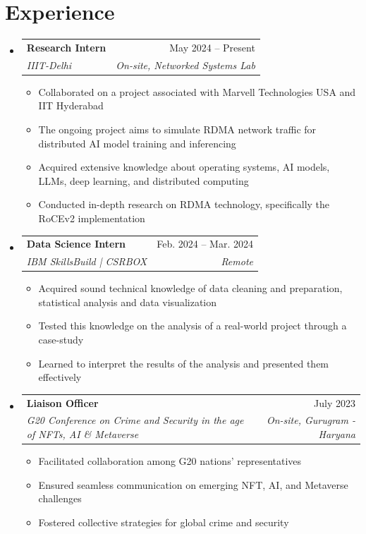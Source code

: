 \documentclass[letterpaper,9pt]{article}
\makeatletter
\newcommand{\resumeItem}[1]{
  \item\small{
    {#1 \vspace{-2pt}}
  }
}
\newcommand{\resumeSubheading}[4]{
  \vspace{-2pt}\item
    \begin{tabular*}{0.97\textwidth}[t]{l@{\extracolsep{\fill}}r}
      \textbf{#1} & #2 \\
      \textit{\small#3} & \textit{\small #4} \\
    \end{tabular*}\vspace{-7pt}
}
\newcommand{\resumeSubHeadingListStart}{\begin{itemize}[leftmargin=0.15in, label={}]}
\newcommand{\resumeSubHeadingListEnd}{\end{itemize}}
\newcommand{\resumeItemListStart}{\begin{itemize}}
\newcommand{\resumeItemListEnd}{\end{itemize}\vspace{-5pt}}
\makeatother
\begin{document}
\section{Experience}
  \resumeSubHeadingListStart
    \resumeSubheading
      {Research Intern}{May 2024 -- Present}
      {IIIT-Delhi}{On-site, Networked Systems Lab}
      \resumeItemListStart
        \resumeItem{Collaborated on a project associated with Marvell Technologies USA and IIT Hyderabad}
        \resumeItem{The ongoing project aims to simulate RDMA network traffic for distributed AI model training and inferencing}
        \resumeItem{Acquired extensive knowledge about operating systems, AI models, LLMs, deep learning, and distributed computing}
        \resumeItem{Conducted in-depth research on RDMA technology, specifically the RoCEv2 implementation}
      \resumeItemListEnd

    \resumeSubheading
      {Data Science Intern}{Feb. 2024 -- Mar. 2024}
      {IBM SkillsBuild | CSRBOX}{Remote}
      \resumeItemListStart
        \resumeItem{Acquired sound technical knowledge of data cleaning and preparation, statistical analysis and data visualization}
        \resumeItem{Tested this knowledge on the analysis of a real-world project through a case-study}
        \resumeItem{Learned to interpret the results of the analysis and presented them effectively}
      \resumeItemListEnd

    \resumeSubheading
      {Liaison Officer}{July 2023}
      {G20 Conference on Crime and Security in the age of NFTs, AI \& Metaverse}{On-site, Gurugram - Haryana}
      \resumeItemListStart
        \resumeItem{Facilitated collaboration among G20 nations' representatives}
        \resumeItem{Ensured seamless communication on emerging NFT, AI, and Metaverse challenges}
        \resumeItem{Fostered collective strategies for global crime and security}
    \resumeItemListEnd
  \resumeSubHeadingListEnd
\end{document}
